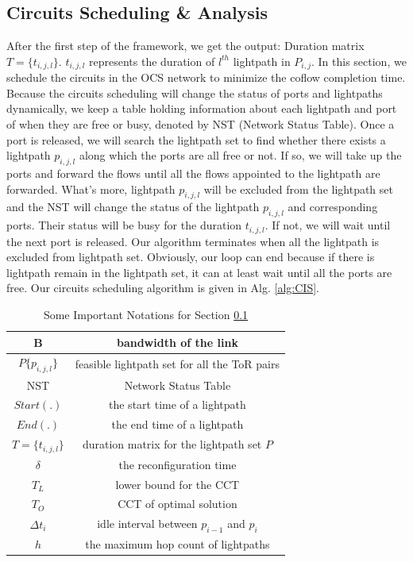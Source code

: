 \subsection{Circuits Scheduling \& Analysis}\label{sec:alg_circuit}
After the first step of the framework, we get the output: Duration matrix $T=\{t_{i,j,l}\}$. $t_{i,j,l}$ represents the duration of $l^{th}$ lightpath in $P_{i,j}$. In this section, we schedule the circuits in the OCS network to minimize the coflow completion time. Because the circuits scheduling will change the status of ports and lightpaths dynamically, we keep a table holding information about each lightpath and port of when they are free or busy, denoted by NST (Network Status Table). Once a port is released, we will search the lightpath set to find whether there exists a lightpath $p_{i,j,l}$ along which the ports are all free or not. If so, we will take up the ports and forward the flows until all the flows appointed to the lightpath are forwarded. What's more, lightpath $p_{i,j,l}$ will be excluded from the lightpath set and the NST will change the status of the lightpath $p_{i,j,l}$ and corresponding ports. Their status will be busy for the duration $t_{i,j,l}$. If not, we will wait until the next port is released. Our algorithm terminates when all the lightpath is excluded from lightpath set. Obviously, our loop can end because if there is lightpath remain in the lightpath set, it can at least wait until all the ports are free. Our circuits scheduling algorithm is given in Alg. \ref{alg:CIS}.
\begin{table}[!tp]
\begin{tabular}{c|c}
\hline
\hline
B& bandwidth of the link\\
\hline
$P\{p_{i,j,l}\}$&feasible lightpath set for all the ToR pairs\\
\hline
NST& Network Status Table\\
\hline
$Start(.)$& the start time of a lightpath\\
\hline
$End(.)$& the end time of a lightpath \\
\hline
$T=\{t_{i,j,l}\}$& duration matrix for the lightpath set $P$\\
\hline
$\delta$ &the reconfiguration time \\
\hline
$T_L$ &lower bound for the CCT\\
\hline
$T_O$ &CCT of optimal solution\\
\hline
$\Delta t_i$ &idle interval between $p_{i-1}$ and $p_i$\\
\hline
$h$ &the maximum hop count of lightpaths\\
\hline
\end{tabular}
\caption{Some Important Notations for Section \ref{sec:alg_circuit}}\label{tbl:notation}
\end{table}

